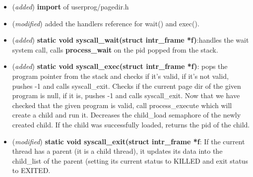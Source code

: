 \documentclass[11pt]{scrartcl}
\begin{document}
\begin{itemize}
    \item (\textit{added}) \textbf{import} of userprog/pagedir.h
    \item(\textit{modified}) added the handlers reference for wait() and exec().
    \item (\textit{added}) \textbf{static void syscall\_wait(struct intr\_frame *f)}:handles the wait system call, calls \textbf{process\_wait} on the pid popped from the stack.
    \item (\textit{added}) \textbf{static void syscall\_exec(struct intr\_frame *f)}: pops the program pointer from the stack and checks if it's valid, if it's not valid, pushes -1 and calls syscall\_exit. Checks if the current page dir of the given program is null, if it is, pushes -1 and calls syscall\_exit. Now that we have checked that the given program is valid, call process\_execute which will create a child and run it. Decreases the child\_load semaphore of the newly created child. If the child was successfully loaded, returns the pid of the child.
    \item(\textit{modified}) \textbf{static void syscall\_exit(struct intr\_frame *f}: If the current thread has a parent (it is a child thread), it updates its data into the child\_list of the parent (setting its current status to KILLED and exit status to EXITED.
    
\end{itemize}
\end{document}
